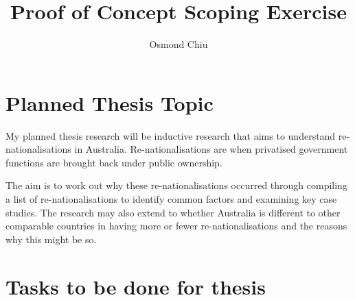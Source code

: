 \documentclass[a4paper]{article}
\title{Proof of Concept Scoping Exercise}
\author{Osmond Chiu}
\begin{document}
\maketitle
\section*{Planned Thesis Topic}

My planned thesis research will be inductive research that aims to understand re-nationalisations in Australia. Re-nationalisations are when privatised government functions are brought back under public ownership.\par
The aim is to work out why these re-nationalisations occurred through compiling a list of re-nationalisations to identify common factors and examining key case studies. The research may also extend to whether Australia is different to other comparable countries in having more or fewer re-nationalisations and the reasons why this might be so.

\section*{Tasks to be done for thesis}
\end{document}
